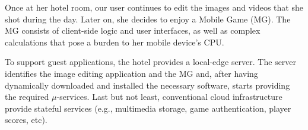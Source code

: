



Once at her hotel room, our user continues to edit the images and videos that she shot during the day. Later on, she decides to enjoy a Mobile Game (MG). The MG consists of client-side logic and user interfaces, as well as complex calculations that pose a burden to her mobile device's CPU. 

To support guest applications, the hotel provides a local-edge server. The server identifies the image editing application and the MG and, after having dynamically downloaded and installed the necessary software, starts providing the required $\mu$-services. %
Last but not least, conventional cloud infrastructure provide stateful services (e.g., multimedia storage, game authentication, player scores, etc).%

